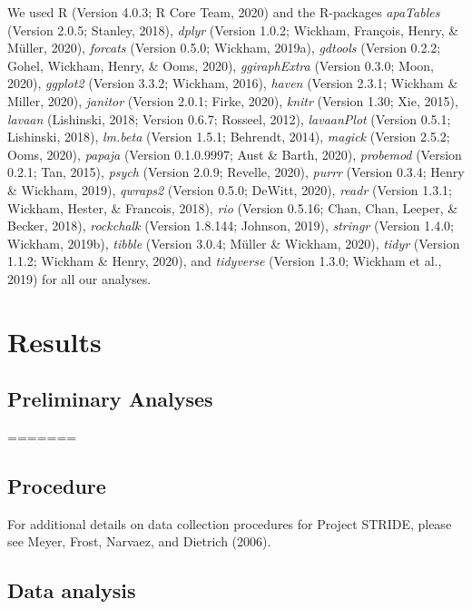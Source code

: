 \documentclass[
  english,
  man,floatsintext]{apa6}
\begin{document}
We used R (Version 4.0.3; R Core Team, 2020) and the R-packages \emph{apaTables} (Version 2.0.5; Stanley, 2018), \emph{dplyr} (Version 1.0.2; Wickham, François, Henry, \& Müller, 2020), \emph{forcats} (Version 0.5.0; Wickham, 2019a), \emph{gdtools} (Version 0.2.2; Gohel, Wickham, Henry, \& Ooms, 2020), \emph{ggiraphExtra} (Version 0.3.0; Moon, 2020), \emph{ggplot2} (Version 3.3.2; Wickham, 2016), \emph{haven} (Version 2.3.1; Wickham \& Miller, 2020), \emph{janitor} (Version 2.0.1; Firke, 2020), \emph{knitr} (Version 1.30; Xie, 2015), \emph{lavaan} (Lishinski, 2018; Version 0.6.7; Rosseel, 2012), \emph{lavaanPlot} (Version 0.5.1; Lishinski, 2018), \emph{lm.beta} (Version 1.5.1; Behrendt, 2014), \emph{magick} (Version 2.5.2; Ooms, 2020), \emph{papaja} (Version 0.1.0.9997; Aust \& Barth, 2020), \emph{probemod} (Version 0.2.1; Tan, 2015), \emph{psych} (Version 2.0.9; Revelle, 2020), \emph{purrr} (Version 0.3.4; Henry \& Wickham, 2019), \emph{qwraps2} (Version 0.5.0; DeWitt, 2020), \emph{readr} (Version 1.3.1; Wickham, Hester, \& Francois, 2018), \emph{rio} (Version 0.5.16; Chan, Chan, Leeper, \& Becker, 2018), \emph{rockchalk} (Version 1.8.144; Johnson, 2019), \emph{stringr} (Version 1.4.0; Wickham, 2019b), \emph{tibble} (Version 3.0.4; Müller \& Wickham, 2020), \emph{tidyr} (Version 1.1.2; Wickham \& Henry, 2020), and \emph{tidyverse} (Version 1.3.0; Wickham et al., 2019) for all our analyses.

\hypertarget{results-1}{%
\section{Results}\label{results-1}}

\hypertarget{preliminary-analyses-1}{%
\subsection{Preliminary Analyses}\label{preliminary-analyses-1}}
=======
\hypertarget{procedure}{%
\subsection{Procedure}\label{procedure}}

For additional details on data collection procedures for Project STRIDE, please see Meyer, Frost, Narvaez, and Dietrich (2006).

\hypertarget{data-analysis}{%
\subsection{Data analysis}\label{data-analysis}}
\end{document}
